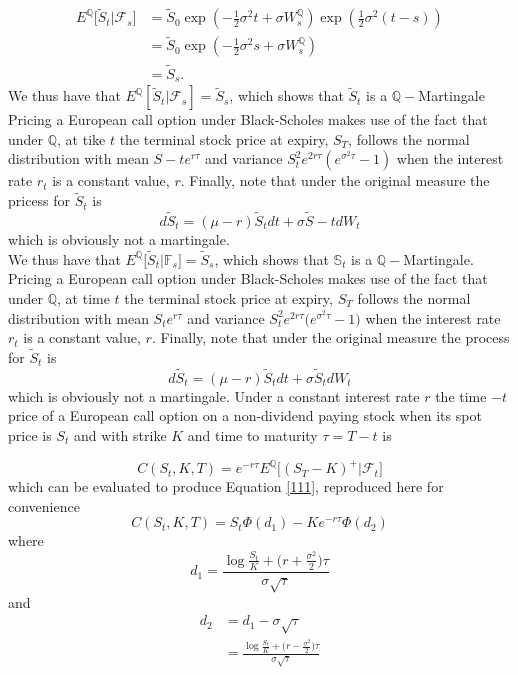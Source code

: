 \documentclass[a4 paper, 12pt]{report}
\theoremstyle{plain}
\begin{document}
\begin{align*}
{E}^\mathbb{Q}\bigg[\tilde{S}_t\bigg|\mathcal{F}_s\bigg]& = \tilde{S}_0\exp(-\frac{1}{2}\sigma^2t+\sigma W_s^\mathbb{Q})\exp(\frac{1}{2}\sigma^2(t-s))\\
& = \tilde{S}_0\exp(-\frac{1}{2}\sigma^2s+\sigma W_s^\mathbb{Q})\\
& = \tilde{S}_s.
\end{align*}
We thus have that $E^\mathbb{Q}[\tilde{S}_t|\mathcal{F}_s] = \tilde{S}_s$, which shows that $\tilde{S}_t$ is a $\mathbb{Q}-$Martingale Pricing a European call option under Black-Scholes makes use of the fact that under $\mathbb{Q}$, at tike $t$ the terminal stock price  at expiry, $S_T$, follows the normal distribution with mean $S-te^{r\tau}$ and variance $S_t^2e^{2r\tau}(e^{\sigma^2\tau}-1)$ when the interest rate $r_t$ is a constant value, $r$. Finally, note that under the original measure the pricess for $\tilde{S}_t$ is
$$
d\tilde{S}_t = (\mu-r)\tilde{S}_tdt+\sigma\tilde{S}-tdW_t
$$  
which is obviously not a martingale.\\
We thus have that $E^\mathbb{Q}\bigg[\tilde{S}_t\bigg|\mathbb{F}_s\bigg] = \tilde{S}_s$, which shows that $\mathbb{S}_t$ is a $\mathbb{Q}-$Martingale. Pricing a European call option under Black-Scholes makes use of the fact that under $\mathbb{Q}$, at time $t$ the terminal stock price at expiry, $S_T$ follows the normal distribution with mean $S_te^{r\tau}$  and variance $S_t^2e^{2r\tau}\bigg(e^{\sigma^2\tau} - 1\bigg)$ when the interest rate $r_t$ is a constant value, $r$. Finally, note that under the original measure the process for $\tilde{S}_t$ is
$$
d\tilde{S}_t = (\mu-r)\tilde{S}_tdt+\sigma\tilde{S}_tdW_t
$$
which is obviously not a martingale. Under a constant interest rate $r$ the time $-t$ price of a European call option on a non-dividend paying stock when its spot price is $S_t$ and with  strike $K$ and time to maturity $\tau = T-t$ is 

\begin{equation}\label{k3.17}
C(S_t,K,T) = e^{-r\tau}E^\mathbb{Q}\bigg[(S_T - K)^+\bigg|\mathcal{F}_t\bigg]
\end{equation}
which can be evaluated to produce Equation \eqref{111}, reproduced here for convenience
$$
C(S_t,K,T) = S_t\Phi(d_1) - Ke^{-r\tau}\Phi(d_2)
$$
where
$$
d_1 = \frac{\log\frac{S_t}{K}+\bigg(r+\frac{\sigma^2}{2}\bigg)\tau}{\sigma\sqrt{\tau}}
$$
and
\begin{align*}
d_2 &  = d_1 -\sigma\sqrt{\tau}\\
& = \frac{\log \frac{S_t}{K}+\bigg(r - \frac{\sigma^2}{2}\bigg)\tau}{\sigma\sqrt{\tau}}
\end{align*}
\end{document}
